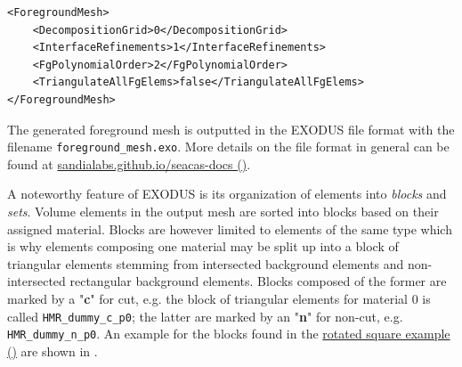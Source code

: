 \begin{minipage}{\linewidth}
\vspace{0.5cm}
\begin{lstlisting}[caption={Definition of a multiple mesh grids},captionpos=b, label={lst:fg_mesh}]
<ForegroundMesh>
    <DecompositionGrid>0</DecompositionGrid>
    <InterfaceRefinements>1</InterfaceRefinements>
    <FgPolynomialOrder>2</FgPolynomialOrder>
    <TriangulateAllFgElems>false</TriangulateAllFgElems>
</ForegroundMesh>
\end{lstlisting}
\end{minipage}

The generated foreground mesh is outputted in the EXODUS file format with the filename \texttt{foreground\_mesh.exo}. More details on the file format in general can be found at \href{https://sandialabs.github.io/seacas-docs/html/index.html}{sandialabs.github.io/seacas-docs (\ExternalLink)}.

\vspace{0.2cm}

A noteworthy feature of EXODUS is its organization of elements into \emph{blocks} and \emph{sets}. Volume elements in the output mesh are sorted into blocks based on their assigned material. Blocks are however limited to elements of the same type which is why elements composing one material may be split up into a block of triangular elements stemming from intersected background elements and non-intersected rectangular background elements. Blocks composed of the former are marked by a "\textbf{c}" for cut, e.g. the block of triangular elements for material $0$ is called \texttt{HMR\_dummy\_c\_p0}; the latter are marked by an "\textbf{n}" for non-cut, e.g. \texttt{HMR\_dummy\_n\_p0}. An example for the blocks found in the \href{https://github.com/kkmaute/moris/blob/main/share/doc/mesh_generation/examples/Rotated_Square_Example.xml}{rotated square example (\ExternalLink)} are shown in .

\vspace{1.2cm}


